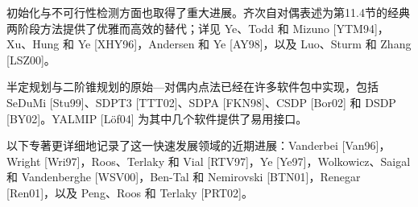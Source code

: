 初始化与不可行性检测方面也取得了重大进展。齐次自对偶表述为第11.4节的经典两阶段方法提供了优雅而高效的替代；详见 Ye、Todd 和 Mizuno [YTM94]，Xu、Hung
和 Ye [XHY96]，Andersen 和 Ye [AY98]，以及 Luo、Sturm 和 Zhang [LSZ00]。

半定规划与二阶锥规划的原始—对偶内点法已经在许多软件包中实现，包括 SeDuMi [Stu99]、SDPT3 [TTT02]、SDPA [FKN98]、CSDP [Bor02] 和 DSDP [BY02]。YALMIP [L\"of04] 为其中几个软件提供了易用接口。

以下专著更详细地记录了这一快速发展领域的近期进展：Vanderbei [Van96]，Wright [Wri97]，Roos、Terlaky 和 Vial [RTV97]，Ye [Ye97]，Wolkowicz、Saigal 和 Vandenberghe [WSV00]，Ben-Tal 和 Nemirovski [BTN01]，Renegar [Ren01]，以及 Peng、Roos 和 Terlaky [PRT02]。
